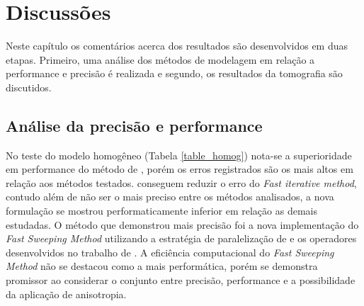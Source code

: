 \chapter{Discussões}
\label{ch:discussoes}

 
Neste capítulo os comentários acerca dos resultados são desenvolvidos em duas etapas. Primeiro, uma análise dos métodos de modelagem em relação a performance e precisão é realizada e segundo, os resultados da tomografia são discutidos.   
 
\section{Análise da precisão e performance} 

No teste do modelo homogêneo (Tabela \ref{table_homog}) nota-se a superioridade em performance do método de , porém os erros registrados são os mais altos em relação aos métodos testados.  conseguem reduzir o erro do \textit{Fast iterative method}, contudo além de não ser o mais preciso entre os métodos analisados, a nova formulação se mostrou performaticamente inferior em relação as demais estudadas. O método que demonstrou mais precisão foi a nova implementação do \textit{Fast Sweeping Method} utilizando a estratégia de paralelização de  e os operadores desenvolvidos no trabalho de . A eficiência computacional do \textit{Fast Sweeping Method} não se destacou como a mais performática, porém se demonstra promissor ao considerar o conjunto entre precisão, performance e a possibilidade da aplicação de anisotropia.  

